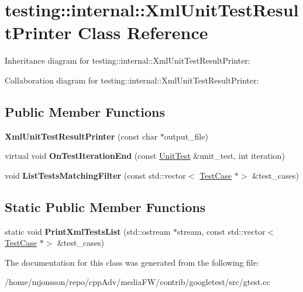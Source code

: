 \hypertarget{classtesting_1_1internal_1_1XmlUnitTestResultPrinter}{}\section{testing\+:\+:internal\+:\+:Xml\+Unit\+Test\+Result\+Printer Class Reference}
\label{classtesting_1_1internal_1_1XmlUnitTestResultPrinter}


Inheritance diagram for testing\+:\+:internal\+:\+:Xml\+Unit\+Test\+Result\+Printer\+:


Collaboration diagram for testing\+:\+:internal\+:\+:Xml\+Unit\+Test\+Result\+Printer\+:
\subsection*{Public Member Functions}
\begin{DoxyCompactItemize}
\item 
\mbox{\label{classtesting_1_1internal_1_1XmlUnitTestResultPrinter_afdaf88e6764c18ce0dcc3733d7a06e31}} 
{\bfseries Xml\+Unit\+Test\+Result\+Printer} (const char $\ast$output\+\_\+file)
\item 
\mbox{\label{classtesting_1_1internal_1_1XmlUnitTestResultPrinter_a2ae986dd2f4f2aed31cc6f3bc8c56898}} 
virtual void {\bfseries On\+Test\+Iteration\+End} (const \hyperlink{classtesting_1_1UnitTest}{Unit\+Test} \&unit\+\_\+test, int iteration)
\item 
\mbox{\label{classtesting_1_1internal_1_1XmlUnitTestResultPrinter_a0f0e0bd707d7aed5c008346d7fa95125}} 
void {\bfseries List\+Tests\+Matching\+Filter} (const std\+::vector$<$ \hyperlink{classtesting_1_1TestCase}{Test\+Case} $\ast$$>$ \&test\+\_\+cases)
\end{DoxyCompactItemize}
\subsection*{Static Public Member Functions}
\begin{DoxyCompactItemize}
\item 
\mbox{\label{classtesting_1_1internal_1_1XmlUnitTestResultPrinter_ad202babf81b4b6d6d2f98df1e27a2d50}} 
static void {\bfseries Print\+Xml\+Tests\+List} (std\+::ostream $\ast$stream, const std\+::vector$<$ \hyperlink{classtesting_1_1TestCase}{Test\+Case} $\ast$$>$ \&test\+\_\+cases)
\end{DoxyCompactItemize}


The documentation for this class was generated from the following file\+:\begin{DoxyCompactItemize}
\item 
/home/mjonsson/repo/cpp\+Adv/media\+F\+W/contrib/googletest/src/gtest.\+cc\end{DoxyCompactItemize}
